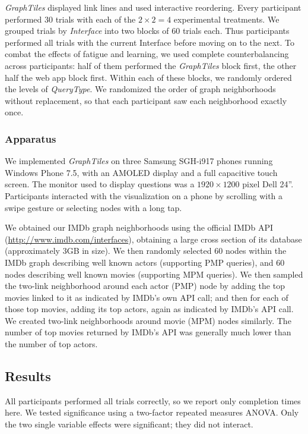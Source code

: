 \textit{GraphTiles} displayed link lines and used interactive reordering. Every participant performed $30$ trials with each of the $2 \times 2 = 4$ experimental treatments. We grouped trials by \textit{Interface} into two blocks of $60$ trials each. Thus participants performed all trials with the current Interface before moving on to the next. To combat the effects of fatigue and learning, we used complete counterbalancing across participants: half of them performed the \textit{GraphTiles} block first, the other half the web app block first. Within each of these blocks, we randomly ordered the levels of \textit{QueryType}. We randomized the order of graph neighborhoods without replacement, so that each participant saw each neighborhood exactly once.

\subsubsection{Apparatus}

We implemented \textit{GraphTiles} on three Samsung SGH-i917 phones running Windows Phone 7.5, with an AMOLED display and a full capacitive touch screen. The monitor used to display questions was a $1920 \times 1200$ pixel Dell 24''. Participants interacted with the visualization on a phone by scrolling with a swipe gesture or selecting nodes with a long tap.

We obtained our IMDb graph neighborhoods using the official IMDb API (\url{http://www.imdb.com/interfaces}), obtaining a large cross section of its database (approximately 3GB in size). We then randomly selected 60 nodes within the IMDb graph describing well known actors (supporting PMP queries), and 60 nodes describing well known movies (supporting MPM queries). We then sampled the two-link neighborhood around each actor (PMP) node by adding the top movies linked to it as indicated by IMDb's own API call; and then for each of those top movies, adding its top actors, again as indicated by IMDb's API call. We created two-link neighborhoods around movie (MPM) nodes similarly. The number of top movies returned by IMDb's API was generally much lower than the number of top actors. 


\subsection{Results}

All participants performed all trials correctly, so we report only completion times here. We tested significance using a two-factor repeated measures ANOVA. Only the two single variable effects were significant; they did not interact. 

